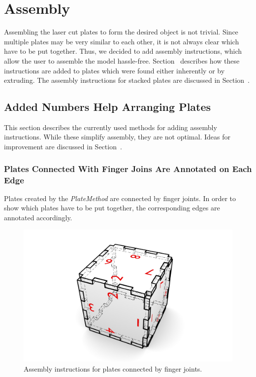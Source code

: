 \documentclass[../ClassicThesis.tex]{subfiles}
\begin{document}
\chapter{Assembly}\label{ch:assembly}

Assembling the laser cut plates to form the desired object is not trivial. Since multiple plates may be very similar to each other, it is not always clear which have to be put together. Thus, we decided to add assembly instructions, which allow the user to assemble the model hassle-free. Section~ describes how these instructions are added to plates which were found either inherently or by extruding. The assembly instructions for stacked plates are discussed in Section~.

\section{Added Numbers Help Arranging Plates}

This section describes the currently used methods for adding assembly instructions. While these simplify assembly, they are not optimal. Ideas for improvement are discussed in Section~.

\subsection{Plates Connected With Finger Joins Are Annotated on Each Edge}\label{sub:assemblyplates}

Plates created by the \emph{PlateMethod} are connected by finger joints. In order to show which plates have to be put together, the corresponding edges are annotated accordingly.

\begin{figure}
    \centering
    \includegraphics[width=1.0\columnwidth]{Images/assembly_plates.png}
    \caption{Assembly instructions for plates connected by finger joints.}
    \label{fig:assemblyplates}
\end{figure}
\end{document}
